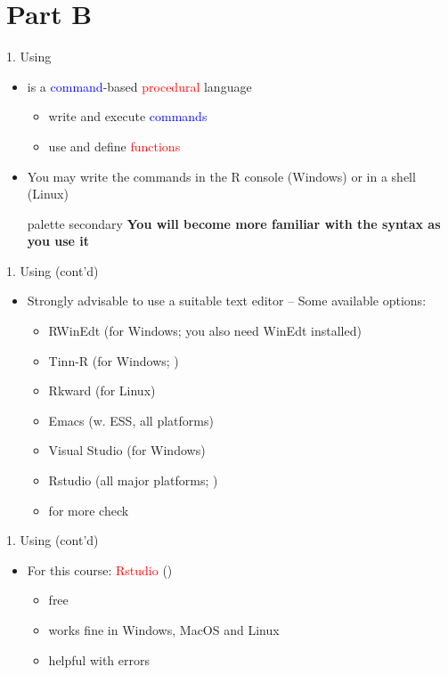\documentclass[14pt, aspectratio=169, sectionpage=simple, xclolor=table]{beamer}
\begin{document}
\section{Part B}
\begin{frame}{1. Using \R}
\begin{itemize}
\item \R is a \textcolor{blue}{command}-based
\textcolor{red}{procedural} language
\begin{itemize}
\item write and execute \textcolor{blue}{commands}
\item use and define \textcolor{red}{functions}
\nl
\end{itemize}
\item You may write the commands in the R console (Windows)
or in a shell (Linux)
\nl
\nl
\nl
\begin{beamercolorbox}[wd=\linewidth, ht=2.5ex, dp=1.125ex,center]{palette secondary}
	\textbf{You will become more familiar with the syntax as you use it}
\end{beamercolorbox}
\end{itemize}
\end{frame}
\begin{frame}[fragile]{1. Using \R (cont'd)}
\begin{itemize}
	\item Strongly advisable to use a suitable text editor --
	Some available options:
	\begin{itemize}
		\item RWinEdt (for Windows; you also need WinEdt installed)
		\item Tinn-R (for Windows; )
		\item Rkward (for Linux)
		\item Emacs (w. ESS, all platforms)
		\item Visual Studio (for Windows)
		\item Rstudio (all major platforms; )
		\item for more check
	\end{itemize}
\end{itemize}
\end{frame}
\begin{frame}{1. Using \R (cont'd)}
\begin{itemize}
	\item For this course: \textcolor{red}{Rstudio} ()
	\begin{itemize}
		\item free
		\item works fine in Windows, MacOS and Linux
		\item helpful with errors
	\end{itemize}
\end{itemize}
\end{frame}
\end{document}

